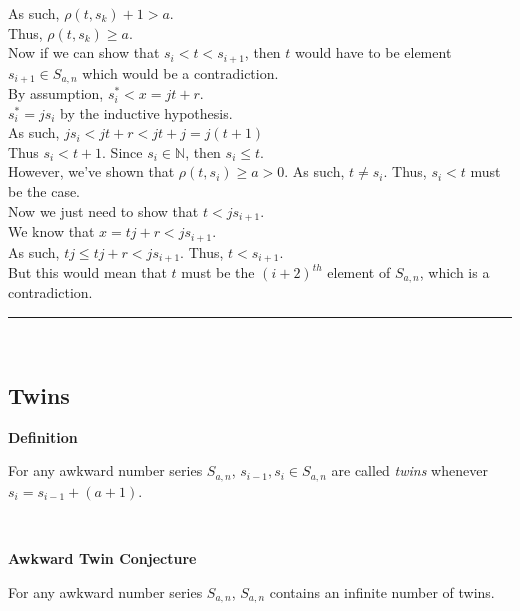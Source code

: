 \documentclass[a4paper,12pt]{article}
\begin{document}
\noindent As such, $\rho(t, s_k) + 1 > a$.\\

\noindent Thus, $\rho(t, s_k) \geq a$.\\

\noindent Now if we can show that $s_i < t < s_{i+1}$, then $t$ would have to be element $s_{i + 1} \in S_{a, n}$ which would be a contradiction.\\

\noindent By assumption, $s^*_i < x = jt + r$.\\

\noindent $s^*_i = js_i$ by the inductive hypothesis.\\

\noindent As such, $js_i < jt + r < jt + j = j(t + 1)$\\

\noindent Thus $s_i < t + 1$. Since $s_i \in \mathbb{N}$, then $s_i \leq t$.\\

\noindent However, we've shown that $\rho(t, s_i) \geq a > 0$. As such, $t \neq s_i$. Thus, $s_i < t$ must be the case.\\

\noindent Now we just need to show that $t < js_{i + 1}$.\\

\noindent We know that $x = tj + r < js_{i+1}$.\\

\noindent As such, $tj \leq tj + r < js_{i+1}$. Thus, $t < s_{i + 1}$.\\

\noindent But this would mean that $t$ must be the $(i + 2)^{th}$ element of $S_{a, n}$, which is a contradiction.


\begin{center}
\noindent\rule{8cm}{0.4pt}
\end{center}
\noindent \\






\subsection{Twins}
\label{subsection:twins}





\label{definition:twins}
\hypertarget{definition:twins}{}
\begin{tcolorbox}
\textbf{Definition}

For any awkward number series $S_{a,n}$, $s_{i - 1}, s_i \in S_{a,n}$ are called \textit{twins} whenever $s_i = s_{i - 1} + (a + 1)$.

\end{tcolorbox}
\noindent \\










\label{conjecture:twin_conjecture}
\hypertarget{conjecture:twin_conjecture}{}
\begin{tcolorbox}
\textbf{Awkward Twin Conjecture}

For any awkward number series $S_{a,n}$, $S_{a, n}$ contains an infinite number of twins.

\end{tcolorbox}
\noindent \\
\end{document}
